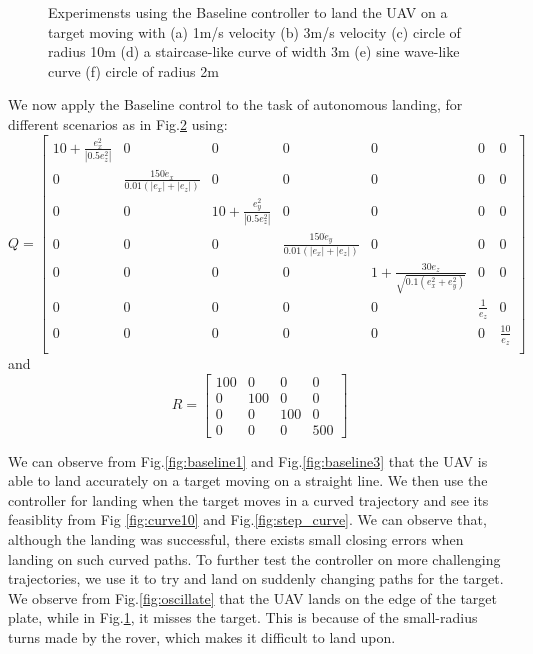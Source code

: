 \documentclass[conf]{new-aiaa}
\begin{document}
\begin{figure}
\begin{subfigure}{0.5\textwidth}
    \caption{} \label{fig:fail}
  \end{subfigure}%
  \hspace*{\fill}   %
\caption{Experimensts using the Baseline controller to land the UAV on a target moving with (a) 1m/s velocity (b) 3m/s velocity (c) circle of radius 10m (d) a staircase-like curve of width 3m (e) sine wave-like curve (f) circle of radius 2m} \label{fig:baseline_land}
\end{figure}

We now apply the Baseline control to the task of autonomous landing, for different scenarios as in Fig.\ref{fig:baseline_land} using: 
\begin{equation}
Q = \begin{bmatrix}
10+\frac{e_{x}^{2}}{|0.5e_{z}^{2}|} & 0 & 0 & 0 & 0 & 0 & 0\\
0 & \frac{150\dot{e}_{x}}{0.01(|e_{x}|+|e_{z}|)} & 0 & 0 & 0 & 0 & 0\\
0 & 0 & 10+\frac{e_{y}^{2}}{|0.5e_{z}^{2}|} & 0 & 0 & 0 & 0\\
0 & 0 & 0 & \frac{150\dot{e}_{y}}{0.01(|e_{x}|+|e_{z}|)} & 0 & 0 & 0\\
0 & 0 & 0 & 0 & 1 + \frac{30e_{z}}{\sqrt{0.1(e_{x}^{2}+e_{y}^{2})}} & 0 & 0\\
0 & 0 & 0 & 0 & 0 & \frac{1}{e_{z}} & 0\\
0 & 0 & 0 & 0 & 0 & 0 & \frac{10}{e_{z}}\\
\end{bmatrix}
\end{equation}
and 
\begin{equation}
R = \begin{bmatrix}
100 & 0 & 0 & 0\\
0 & 100 & 0 & 0\\
0 & 0 & 100 & 0\\
0 & 0 & 0 & 500
\end{bmatrix}
\end{equation}

We can observe from Fig.\ref{fig:baseline1} and Fig.\ref{fig:baseline3} that the UAV is able to land accurately on a target moving on a straight line. We then use the controller for landing when the target moves in a curved trajectory and see its feasiblity from Fig \ref{fig:curve10} and Fig.\ref{fig:step_curve}. We can observe that, although the landing was successful, there exists small closing errors when landing on such curved paths. To further test the controller on more challenging trajectories, we use it to try and land on suddenly changing paths for the target. We observe from Fig.\ref{fig:oscillate} that the UAV lands on the edge of the target plate, while in Fig.\ref{fig:fail}, it misses the target. This is because of the small-radius turns made by the rover, which makes it difficult to land upon. 
\end{document}
